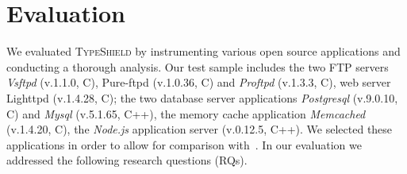 \section{Evaluation}
\label{chapter:Evaluation}
We evaluated \textsc{TypeShield} by instrumenting various open source applications and conducting a thorough analysis. Our test sample includes the two 
FTP servers \textit{Vsftpd} (v.1.1.0, C), Pure-ftpd (v.1.0.36, C) and 
\textit{Proftpd} (v.1.3.3, C), 
web server Lighttpd (v.1.4.28, C); 
the two database server applications 
\textit{Postgresql} (v.9.0.10, C) and 
\textit{Mysql} (v.5.1.65, C++), 
the memory cache application 
\textit{Memcached} (v.1.4.20, C), 
the \textit{Node.js} application server (v.0.12.5, C++). 
We selected these applications in order to allow for comparison with~\cite{veen:typearmor}. 
In our evaluation we addressed the following research questions (RQs).

